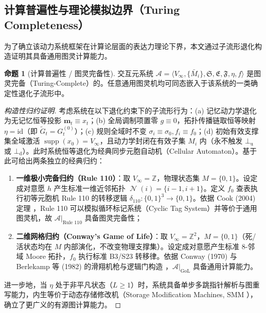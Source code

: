 \documentclass[11pt,a4paper]{article}
\numberwithin{equation}{section}
\theoremstyle{definition}
\newtheorem{proposition}[definition]{命题}
\theoremstyle{remark}
\DeclareMathOperator{\Ncal}{\mathcal{N}}   %
\DeclareMathOperator{\supp}{\mathrm{supp}} %
\begin{document}
	\subsection{计算普遍性与理论模拟边界（Turing Completeness）}
	
	为了确立该动力系统框架在计算论层面的表达力理论下界，本文通过子流形退化构造证明其具备通用图灵计算能力。
	
	\begin{proposition}[计算普遍性 / 图灵完备性]\label{prop:turing-completeness}
		交互元系统 $\mathcal{A}=\langle V_\infty,\{\bar{M}_i\},\mathfrak{S},\mathfrak{E},\mathfrak{F},\eta,f\rangle$ 是图灵完备（Turing-Complete）的。任意通用图灵机均可同态嵌入于该系统的一类确定性退化子流形中。
	\end{proposition}
	
	\begin{proof}[构造性归约证明]
		考虑系统在以下退化约束下的子流形行为：(a) 记忆动力学退化为无记忆恒等投影 $\mathbf{m}_t \equiv x_t$；(b) 全局调制项置零 $g \equiv 0$，拓扑传播链取恒等映射 $\eta = \mathrm{id}$（即 $\widetilde{G}_t = G_t^{(0)}$）；(c) 规则全域时不变 $\sigma_i \equiv \sigma_0, f_i \equiv f_0$；(d) 初始有效支撑集全域激活 $\supp(x_0) = V_\infty$，且动力学封闭在有效子集 $M_i$ 内（永不触发 $\bot_{\mathrm{u}}$ 或 $\bot_{\mathrm{d}}$）。此时系统恒等退化为经典同步元胞自动机（Cellular Automaton）。基于此可给出两条独立的经典归约：
		\begin{enumerate}[label=(\arabic*), leftmargin=2.4em]
			\item \textbf{一维极小完备归约（Rule 110）}：取 $V_\infty = \mathbb{Z}$，物理状态集 $M = \{0, 1\}$。设定成对意愿 $h$ 产生标准一维近邻拓扑 $\Ncal(i) = \{i-1, i+1\}$。定义 $f_0$ 查表执行初等元胞机 Rule 110 的转移逻辑 $\delta_{110}: \{0,1\}^3 \to \{0,1\}$。依据 Cook (2004) 定理 \cite{cook2004universality}，Rule 110 可以模拟循环标记系统（Cyclic Tag System）并等价于通用图灵机，故 $\mathcal{A}|_{\text{Rule 110}}$ 具备图灵完备性；
			\item \textbf{二维网格归约（Conway's Game of Life）}：取 $V_\infty = \mathbb{Z}^2$，$M = \{0, 1\}$（死/活状态均在 $M$ 内部演化，不改变物理支撑集）。设定成对意愿产生标准 8-邻域 Moore 拓扑，$f_0$ 执行标准 B3/S23 转移律。依据 Conway (1970) 与 Berlekamp 等 (1982) 的滑翔机枪与逻辑门构造 \cite{berlekamp1982winning}，$\mathcal{A}|_{\text{GoL}}$ 具备通用计算能力。
		\end{enumerate}
		进一步地，当 $\eta$ 处于非平凡状态（$L \ge 1$）时，系统具备单步多跳指针解析与图重写能力，内生等价于动态存储修改机（Storage Modification Machines, SMM \cite{schonhage1980storage}），确立了更广义的有源图计算能力。
	\end{proof}
	
\end{document}
